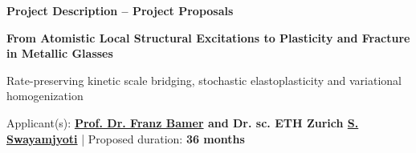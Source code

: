 \documentclass[11pt,a4paper]{article}
\begin{document}
\begin{center}
{\small\bfseries Project Description -- Project Proposals}\par\vspace{8pt}
{\LARGE\bfseries\color{black}From Atomistic Local Structural Excitations to Plasticity and Fracture in Metallic Glasses}\par\vspace{8pt}
{\large Rate-preserving kinetic scale bridging, stochastic elastoplasticity and variational homogenization}\par\vspace{10pt}
{\normalsize Applicant(s): \textbf{\underline{Prof. Dr. Franz Bamer} and Dr. sc. ETH Zurich \underline{S. Swayamjyoti}} \quad | \quad Proposed duration: \textbf{36 months}}\par
\end{center}
\vspace{6pt}
\end{document}
